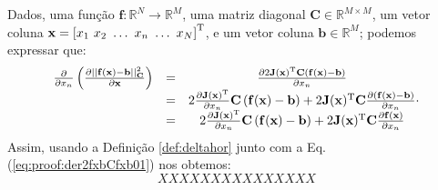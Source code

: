 \begin{myproofT}\label{proof:theo:der2fxbCfxb0}
Dados,
uma função $\mathbf{f}:\mathbb{R}^{N} \rightarrow \mathbb{R}^{M}$, 
uma matriz diagonal $\mathbf{C}\in \mathbb{R}^{M\times M}$, 
um vetor coluna $\mathbf{x}=\left[x_{1}~ x_{2}~ \hdots~ x_{n}~ \hdots~ x_{N}\right]^{\mathrm{T}}$, e
um vetor coluna $\mathbf{b}\in \mathbb{R}^{M}$;
podemos expressar que:
\begin{equation}\label{eq:proof:der2fxbCfxb01}
\begin{matrix}
\frac{\partial }{\partial x_{n}}\left( \frac{\partial ||\mathbf{f}(\mathbf{x})-\mathbf{b}||_{\mathbf{C}}^2}{\partial \mathbf{x}} \right) & = &
\frac{\partial 2 \mathbf{J}(\mathbf{x})^{\mathrm{T}} \mathbf{C} \left( \mathbf{f}(\mathbf{x})-\mathbf{b}\right)}{\partial x_{n}} \\
~ & = & 2 \frac{\partial \mathbf{J}(\mathbf{x})^{\mathrm{T}} }{\partial x_{n}} \mathbf{C} \left( \mathbf{f}(\mathbf{x})-\mathbf{b}\right)+
2  \mathbf{J}(\mathbf{x})^{\mathrm{T}}  \mathbf{C} \frac{\partial \left( \mathbf{f}(\mathbf{x})-\mathbf{b}\right) }{\partial x_{n}}\\
~ & = & 2 \frac{\partial \mathbf{J}(\mathbf{x})^{\mathrm{T}} }{\partial x_{n}} \mathbf{C} \left( \mathbf{f}(\mathbf{x})-\mathbf{b}\right)+
2  \mathbf{J}(\mathbf{x})^{\mathrm{T}}  \mathbf{C} \frac{\partial \mathbf{f}(\mathbf{x}) }{\partial x_{n}}\\
\end{matrix}.
\end{equation}
Assim, usando a Definição \ref{def:deltahor} junto com a Eq. (\ref{eq:proof:der2fxbCfxb01})
nos obtemos:
\begin{equation}\label{eq:proof:der2fxbCfxb02}
XXXXXXX XXXXXXXX 
\end{equation}
\end{myproofT}


